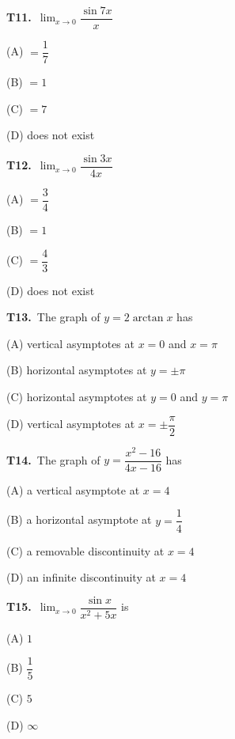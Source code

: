 \documentclass[11pt]{article}
\begin{document}
\bigskip\noindent\textbf{T11.}\ $\displaystyle\lim_{x\to 0}\dfrac{\sin 7x}{x}$
\begin{list}{}{\setlength{\leftmargin}{3em}\setlength{\labelwidth}{2.5em}\setlength{\itemsep}{0pt}\setlength{\topsep}{2pt}}
\item[(A)] $=\dfrac{1}{7}$
\item[(B)] $=1$
\item[(C)] $=7$
\item[(D)] does not exist
\end{list}

\bigskip\noindent\textbf{T12.}\ $\displaystyle\lim_{x\to 0}\dfrac{\sin 3x}{4x}$
\begin{list}{}{\setlength{\leftmargin}{3em}\setlength{\labelwidth}{2.5em}\setlength{\itemsep}{0pt}\setlength{\topsep}{2pt}}
\item[(A)] $=\dfrac{3}{4}$
\item[(B)] $=1$
\item[(C)] $=\dfrac{4}{3}$
\item[(D)] does not exist
\end{list}

\bigskip\noindent\textbf{T13.}\ The graph of $y = 2\arctan x$ has
\begin{list}{}{\setlength{\leftmargin}{3em}\setlength{\labelwidth}{2.5em}\setlength{\itemsep}{0pt}\setlength{\topsep}{2pt}}
\item[(A)] vertical asymptotes at $x = 0$ and $x = \pi$
\item[(B)] horizontal asymptotes at $y = \pm\pi$
\item[(C)] horizontal asymptotes at $y = 0$ and $y = \pi$
\item[(D)] vertical asymptotes at $x = \pm\dfrac{\pi}{2}$
\end{list}

\bigskip\noindent\textbf{T14.}\ The graph of $y = \dfrac{x^2-16}{4x-16}$ has
\begin{list}{}{\setlength{\leftmargin}{3em}\setlength{\labelwidth}{2.5em}\setlength{\itemsep}{0pt}\setlength{\topsep}{2pt}}
\item[(A)] a vertical asymptote at $x = 4$
\item[(B)] a horizontal asymptote at $y = \dfrac{1}{4}$
\item[(C)] a removable discontinuity at $x = 4$
\item[(D)] an infinite discontinuity at $x = 4$
\end{list}

\bigskip\noindent\textbf{T15.}\ $\displaystyle\lim_{x\to 0}\dfrac{\sin x}{x^2+5x}$ is
\begin{list}{}{\setlength{\leftmargin}{3em}\setlength{\labelwidth}{2.5em}\setlength{\itemsep}{0pt}\setlength{\topsep}{2pt}}
\item[(A)] $1$
\item[(B)] $\dfrac{1}{5}$
\item[(C)] $5$
\item[(D)] $\infty$
\end{list}
\end{document}
